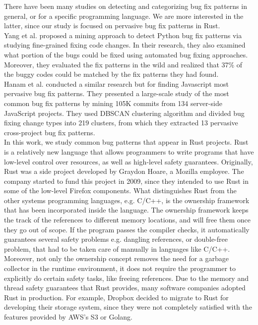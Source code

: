There have been many studies on detecting and categorizing bug fix patterns in general, or for a specific programming language. We are more interested in the latter, since
our study is focused on pervasive bug fix patterns in Rust. \\
Yang et al. proposed a mining approach to detect Python bug fix patterns via studying
fine-grained fixing code changes. In their research, they also examined what portion of the bugs
could be fixed using automated bug fixing approaches. Moreover, they evaluated the fix patterns in
the wild and realized that 37\% of the buggy codes could be matched by the fix patterns they had
found. \\
Hanam et al. conducted a similar research but for finding Javascript most pervasive bug fix
patterns. They presented a large-scale study of the most common bug fix patterns by mining 105K
commits from 134 server-side JavaScript projects. They used DBSCAN clustering algorithm
and divided bug fixing change types into 219 clusters, from which they extracted 13 pervasive
cross-project bug fix patterns. \\
In this work, we study common bug patterns that appear in Rust projects. Rust is a relatively new language that allows programmers to write programs that have low-level
control over resources, as well as high-level safety guarantees. Originally, Rust was a side
project developed by Graydon Hoare, a Mozilla employee. The company started to fund this project
in 2009, since they intended to use Rust in some of the low-level Firefox components.
What distinguishes Rust from the other systems programming languages, e.g. C/C++, is the
ownership framework that has been incorporated inside the language. The ownership framework keeps the track of the references to different memory locations, and will free them once they
go out of scope. If the program passes the compiler checks, it automatically guarantees several
safety problems e.g. dangling references, or double-free problem, that had to be taken care of
manually in languages like C/C++. Moreover, not only the ownership concept removes the
need for a garbage collector in the runtime environment, it does not require the programmer to
explicitly do certain safety tasks, like freeing references.
Due to the memory and thread safety guarantees that Rust provides, many software companies
adopted Rust in production. For example, Dropbox decided to migrate to Rust for developing their
storage system, since they were not completely satisfied with the features provided by AWS’s S3 or
Golang.

